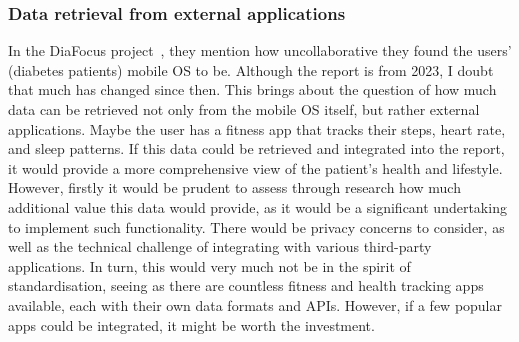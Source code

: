 \subsubsection*{Data retrieval from external applications}
In the DiaFocus project~\cite{DiaFocus}, they mention how uncollaborative they found the users' (diabetes patients) mobile OS to be. Although the report is from 2023, I doubt that much has changed since then. This brings about the question of how much data can be retrieved not only from the mobile OS itself, but rather external applications. Maybe the user has a fitness app that tracks their steps, heart rate, and sleep patterns. If this data could be retrieved and integrated into the report, it would provide a more comprehensive view of the patient's health and lifestyle. However, firstly it would be prudent to assess through research how much additional value this data would provide, as it would be a significant undertaking to implement such functionality. There would be privacy concerns to consider, as well as the technical challenge of integrating with various third-party applications. In turn, this would very much not be in the spirit of standardisation, seeing as there are countless fitness and health tracking apps available, each with their own data formats and APIs. However, if a few popular apps could be integrated, it might be worth the investment.


